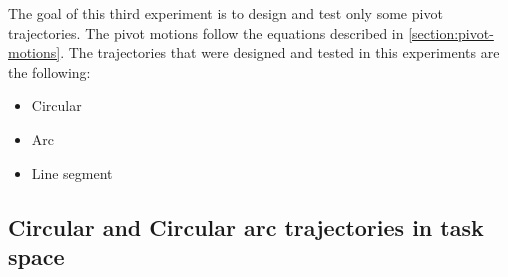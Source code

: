 The goal of this third experiment is to design and test only some pivot trajectories. The pivot motions follow the equations described in 
\ref{section:pivot-motions}. The trajectories that were designed and tested in this experiments are the following:
\begin{itemize}
\item Circular
\item Arc
\item Line segment
\end{itemize}

\subsection{Circular and Circular arc trajectories in task space}

